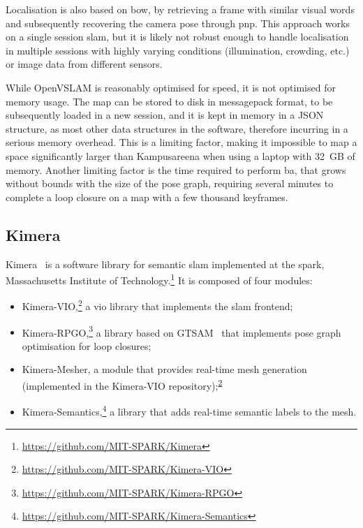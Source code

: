 \documentclass[11pt, letterpaper, twoside]{article}
\begin{document}
Localisation is also based on \gls{bow}, by retrieving a frame with similar
visual words and subsequently recovering the camera pose through \gls{pnp}.
This approach works on a single session \gls{slam}, but it is likely not robust
enough to handle localisation in multiple sessions with highly varying
conditions (illumination, crowding, etc.) or image data from different sensors.

While OpenVSLAM is reasonably optimised for speed, it is not optimised for
memory usage. The map can be stored to disk in messagepack format, to be
subsequently loaded in a new session, and it is kept in memory in a JSON
structure, as most other data structures in the software, therefore incurring
in a serious memory overhead. This is a limiting factor, making it impossible
to map a space significantly larger than Kampusareena when using a laptop with
32~GB of memory. Another limiting factor is the time required to perform
\gls{ba}, that grows without bounds with the size of the pose graph, requiring
several minutes to complete a loop closure on a map with a few thousand
keyframes.

\subsection{Kimera}

Kimera~\cite{rosinol2019kimera} is a software library for semantic \gls{slam}
implemented at the \gls{spark}, Massachusetts Institute of
Technology.\footnote{\url{https://github.com/MIT-SPARK/Kimera}} It is composed
of four modules:

\begin{itemize}
    \item
        Kimera-VIO,\footnote{\label{note:kimera_vio}\url{https://github.com/MIT-SPARK/Kimera-VIO}} a
        \gls{vio} library that implements the \gls{slam} frontend;
    \item
        Kimera-RPGO,\footnote{\url{https://github.com/MIT-SPARK/Kimera-RPGO}}
        a library based on GTSAM~\cite{dellaert2006square,dellaert2012factor}
        that implements pose graph optimisation for loop closures;
    \item
        Kimera-Mesher, a module that provides real-time mesh generation
        (implemented in the Kimera-VIO
        repository);\textsuperscript{\ref{note:kimera_vio}}
    \item
        Kimera-Semantics,\footnote{\url{https://github.com/MIT-SPARK/Kimera-Semantics}}
        a library that adds real-time semantic labels to the mesh.
\end{itemize}
\end{document}
